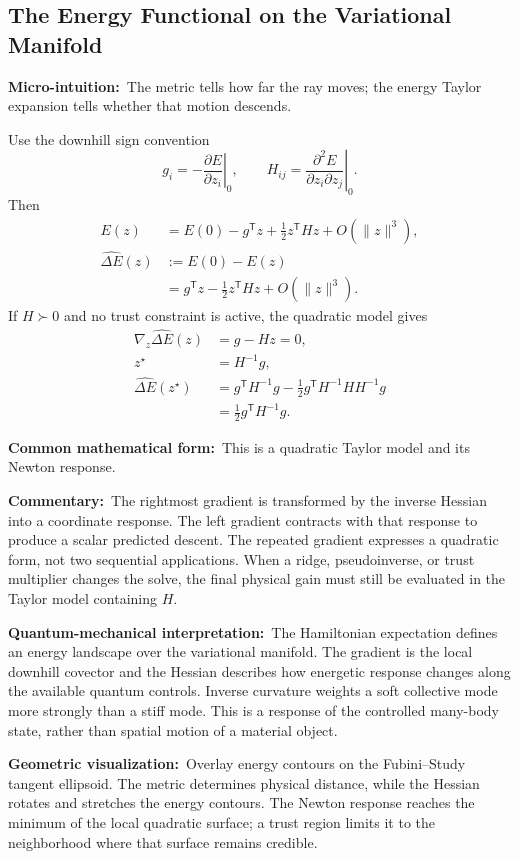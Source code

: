 \documentclass[10pt,twocolumn]{article}
\newcommand{\micro}[1]{\par\noindent\textbf{Micro-intuition:}\ #1\par}
\newcommand{\form}[1]{\par\noindent\textbf{Common mathematical form:}\ #1\par}
\newcommand{\commentary}[1]{\par\noindent\textbf{Commentary:}\ #1\par}
\newcommand{\phys}[1]{\par\noindent\textbf{Quantum-mechanical interpretation:}\ #1\par}
\newcommand{\geom}[1]{\par\noindent\textbf{Geometric visualization:}\ \textcolor{teal!70!black}{#1}\par}
\newcommand{\conceptbreak}{\par\medskip\noindent{\color{black!30}\rule{\columnwidth}{0.35pt}}\par\medskip}
\begin{document}
\conceptbreak

\subsection*{The Energy Functional on the Variational Manifold}

\micro{The metric tells how far the ray moves; the energy Taylor expansion
tells whether that motion descends.}

Use the downhill sign convention
\[
g_i=-\left.\frac{\partial E}{\partial z_i}\right|_{0},
\qquad
H_{ij}=\left.\frac{\partial^2E}
{\partial z_i\partial z_j}\right|_{0}.
\]
Then
\begin{align*}
E(z)
&=E(0)-g^{\mathsf T}z
+\frac12z^{\mathsf T}Hz+O(\|z\|^3),\\
\widehat{\Delta E}(z)
&:=E(0)-E(z)\\
&=g^{\mathsf T}z-\frac12z^{\mathsf T}Hz+O(\|z\|^3).
\end{align*}
If \(H\succ0\) and no trust constraint is active, the quadratic model gives
\begin{align*}
\nabla_z\widehat{\Delta E}(z)&=g-Hz=0,\\
z^\star&=H^{-1}g,\\
\widehat{\Delta E}(z^\star)
&=g^{\mathsf T}H^{-1}g
-\frac12g^{\mathsf T}H^{-1}HH^{-1}g\\
&=\frac12g^{\mathsf T}H^{-1}g.
\end{align*}

\form{This is a quadratic Taylor model and its Newton response.}

\commentary{The rightmost gradient is transformed by the inverse Hessian into
a coordinate response. The left gradient contracts with that response to
produce a scalar predicted descent. The repeated gradient expresses a
quadratic form, not two sequential applications. When a ridge, pseudoinverse,
or trust multiplier changes the solve, the final physical gain must still be
evaluated in the Taylor model containing \(H\).}

\phys{The Hamiltonian expectation defines an energy landscape over the
variational manifold. The gradient is the local downhill covector and the
Hessian describes how energetic response changes along the available quantum
controls. Inverse curvature weights a soft collective mode more strongly than
a stiff mode. This is a response of the controlled many-body state, rather
than spatial motion of a material object.}

\geom{Overlay energy contours on the Fubini--Study tangent ellipsoid. The
metric determines physical distance, while the Hessian rotates and stretches
the energy contours. The Newton response reaches the minimum of the local
quadratic surface; a trust region limits it to the neighborhood where that
surface remains credible.}
\end{document}
